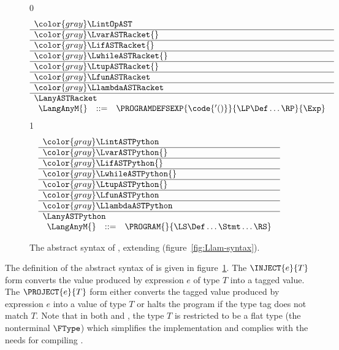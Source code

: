 \documentclass[7x10]{TimesAPriori_MIT}%
\newcommand{\gray}[1]{{\color{gray} #1}}
\def\racketEd{0}
\def\pythonEd{1}
\def\edition{1}
\newcommand{\racket}[1]{{\if\edition\racketEd{#1}\fi}}
\newcommand{\pythonColor}[0]{}
\numberwithin{theorem}{chapter}
\numberwithin{definition}{chapter}
\numberwithin{equation}{chapter}
\begin{document}
\begin{figure}[tp]
\centering
\begin{tcolorbox}[colback=white]
    \small
{\if\edition\racketEd
\[
\begin{array}{l}
  \gray{\LintOpAST} \\ \hline
  \gray{\LvarASTRacket{}} \\ \hline
  \gray{\LifASTRacket{}} \\ \hline
  \gray{\LwhileASTRacket{}} \\ \hline
  \gray{\LtupASTRacket{}} \\ \hline
  \gray{\LfunASTRacket} \\ \hline
  \gray{\LlambdaASTRacket} \\ \hline
  \LanyASTRacket \\
\begin{array}{lcl}
  \LangAnyM{} &::=& \PROGRAMDEFSEXP{\code{'()}}{\LP\Def\ldots\RP}{\Exp}
\end{array}
\end{array}
\]
\fi}
{\if\edition\pythonEd\pythonColor
\[
\begin{array}{l}
  \gray{\LintASTPython} \\ \hline
  \gray{\LvarASTPython{}} \\ \hline
  \gray{\LifASTPython{}} \\ \hline
  \gray{\LwhileASTPython{}} \\ \hline
  \gray{\LtupASTPython{}} \\ \hline
  \gray{\LfunASTPython} \\ \hline
  \gray{\LlambdaASTPython} \\ \hline
  \LanyASTPython \\
  \begin{array}{lcl}
  \LangAnyM{} &::=& \PROGRAM{}{\LS \Def \ldots \Stmt \ldots \RS}
  \end{array}
\end{array}
\]
\fi}
\end{tcolorbox}

\caption{The abstract syntax of \LangAny{}, extending \LangLam{} (figure~\ref{fig:Llam-syntax}).}
\label{fig:Lany-syntax}
\end{figure}

The definition of the abstract syntax of \LangAny{} is given in
figure~\ref{fig:Lany-syntax}.
The $\INJECT{e}{T}$ form converts the value produced by expression $e$
of type $T$ into a tagged value.  The $\PROJECT{e}{T}$ form either
converts the tagged value produced by expression $e$ into a value of
type $T$ or halts the program if the type tag does not match $T$.
%
Note that in both  and , the type $T$ is
restricted to be a flat type (the nonterminal $\FType$) which
simplifies the implementation and complies with the needs for
compiling \LangDyn{}.
\end{document}
